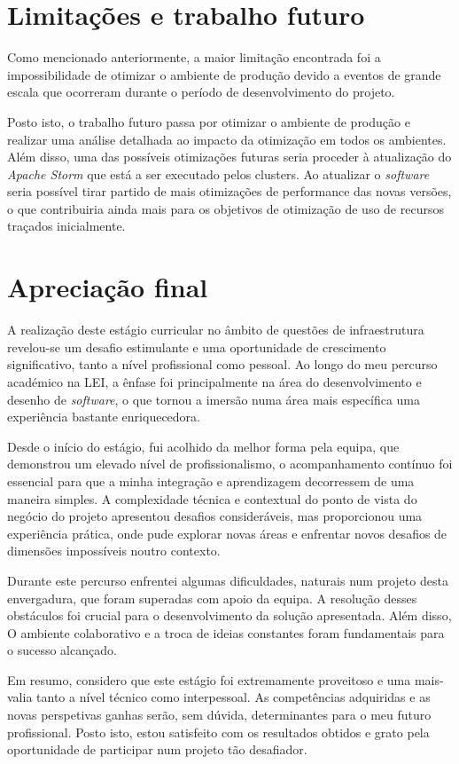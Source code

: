 \section{Limitações e trabalho futuro}

Como mencionado anteriormente, a maior limitação encontrada foi a impossibilidade de otimizar o
ambiente de produção devido a eventos de grande escala que ocorreram durante o período de
desenvolvimento do projeto. 

Posto isto, o trabalho futuro passa por otimizar o ambiente de produção e realizar uma análise 
detalhada ao impacto da otimização em todos os ambientes. Além disso, uma das possíveis otimizações 
futuras seria proceder à atualização do \textit{Apache Storm} que está a ser executado pelos 
\glspl{cluster}. Ao atualizar o \textit{software} seria possível tirar partido de mais otimizações 
de performance das novas versões, o que contribuiria ainda mais para os objetivos de otimização
de uso de recursos traçados inicialmente.

\section{Apreciação final}

A realização deste estágio curricular no âmbito de questões de infraestrutura revelou-se um desafio 
estimulante e uma oportunidade de crescimento significativo, tanto a nível profissional como 
pessoal. Ao longo do meu percurso académico na \ac{LEI}, a ênfase foi principalmente na área do 
desenvolvimento e desenho de \textit{software}, o que tornou a imersão numa área mais específica 
uma experiência bastante enriquecedora.

Desde o início do estágio, fui acolhido da melhor forma pela equipa, que demonstrou um elevado 
nível de profissionalismo, o acompanhamento contínuo foi essencial para que a minha integração e 
aprendizagem decorressem de uma maneira simples. A complexidade técnica e contextual do ponto de 
vista do negócio do projeto apresentou desafios consideráveis, mas proporcionou uma experiência 
prática, onde pude explorar novas áreas e enfrentar novos desafios de dimensões impossíveis noutro 
contexto.

Durante este percurso enfrentei algumas dificuldades, naturais num projeto desta envergadura, que 
foram superadas com apoio da equipa. A resolução desses obstáculos foi crucial para o desenvolvimento
da solução apresentada. Além disso, O ambiente colaborativo e a troca de ideias constantes foram 
fundamentais para o sucesso alcançado.

Em resumo, considero que este estágio foi extremamente proveitoso e uma mais-valia tanto a nível
técnico como interpessoal. As competências adquiridas e as novas perspetivas ganhas serão, sem 
dúvida, determinantes para o meu futuro profissional. Posto isto, estou satisfeito com os resultados 
obtidos e grato pela oportunidade de participar num projeto tão desafiador.

